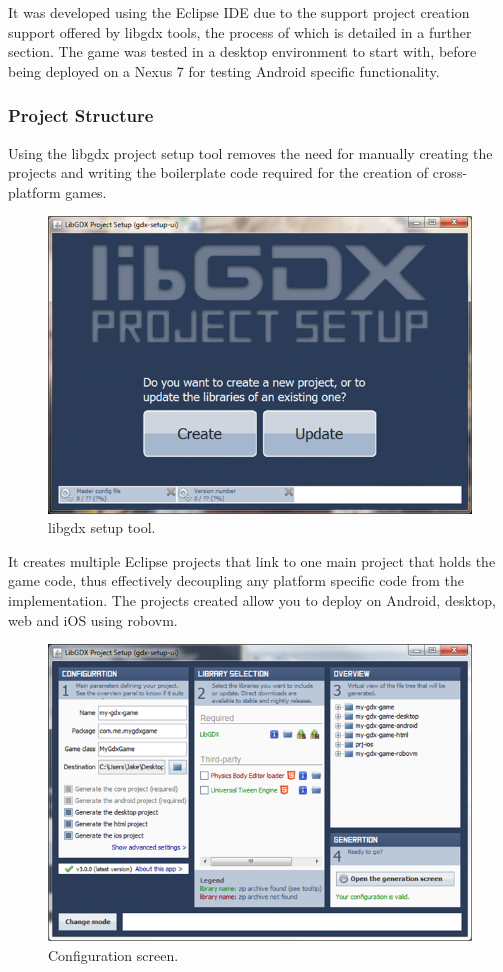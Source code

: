 It was developed using the Eclipse IDE due to the support project creation support offered by libgdx tools, the process of which is detailed in a further section. The game was tested in a desktop environment to start with, before being deployed on a Nexus 7 for testing Android specific functionality.

\subsubsection{Project Structure}
Using the libgdx project setup tool removes the need for manually creating the projects and writing the boilerplate code required for the creation of cross-platform games. 

\begin{figure}[h!]
\centering\includegraphics{implementation/figures/gdx-setup-1.png}
\caption{libgdx setup tool.}
\end{figure}

It creates multiple Eclipse projects that link to one main project that holds the game code, thus effectively decoupling any platform specific code from the implementation. The projects created allow you to deploy on Android, desktop, web and iOS using robovm.

\begin{figure}[h!]
\centering\includegraphics{implementation/figures/gdx-setup-2.png}
\caption{Configuration screen.}
\end{figure}

